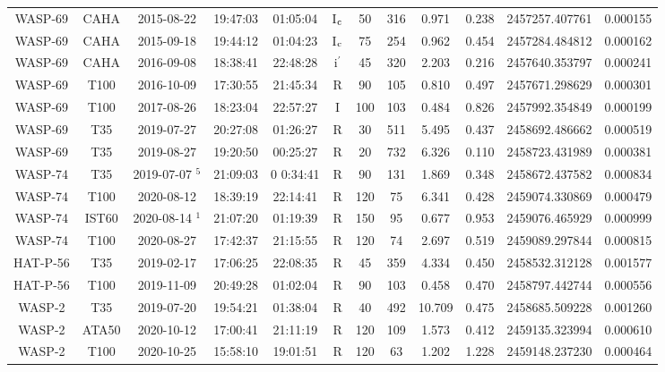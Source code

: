 \documentclass[a4paper,fleqn,usenatbib]{mnras}
\begin{document}
\begin{table*}
\begin{threeparttable}
\begin{tabular}{cccccccccccc}
                WASP-69 & CAHA & 2015-08-22 & 19:47:03 & 01:05:04 & I$_{\rm c}$ & 50 & 316 & 0.971 & 0.238 & 2457257.407761 & 0.000155 \\
                WASP-69 & CAHA & 2015-09-18 & 19:44:12 & 01:04:23 & I$_{\rm c}$ & 75 & 254 & 0.962 & 0.454 & 2457284.484812 & 0.000162 \\
                WASP-69 & CAHA & 2016-09-08 & 18:38:41 & 22:48:28 & i$^{\prime}$ & 45 & 320 & 2.203 & 0.216 & 2457640.353797 & 0.000241 \\
                WASP-69 & T100 & 2016-10-09 & 17:30:55 & 21:45:34 & R & 90 & 105 & 0.810 & 0.497 & 2457671.298629 & 0.000301 \\
                WASP-69 & T100 & 2017-08-26 & 18:23:04 & 22:57:27 & I & 100 & 103 & 0.484 & 0.826 & 2457992.354849 & 0.000199 \\
                WASP-69 & T35 & 2019-07-27 & 20:27:08 & 01:26:27 & R & 30 & 511 & 5.495 & 0.437 & 2458692.486662 & 0.000519 \\
                WASP-69 & T35 & 2019-08-27 & 19:20:50 & 00:25:27 & R & 20 & 732 & 6.326 & 0.110 & 2458723.431989 & 0.000381 \\
                WASP-74 & T35 & 2019-07-07 $^5$ & 21:09:03 &0 0:34:41 & R & 90 & 131 & 1.869 & 0.348 & 2458672.437582 & 0.000834 \\
                WASP-74 & T100 & 2020-08-12 & 18:39:19 & 22:14:41 & R & 120 & 75 & 6.341 & 0.428 & 2459074.330869 & 0.000479 \\
                WASP-74 & IST60 & 2020-08-14 $^1$ & 21:07:20 & 01:19:39 & R & 150 & 95 & 0.677 & 0.953 & 2459076.465929 & 0.000999 \\
                WASP-74 & T100 & 2020-08-27 & 17:42:37 & 21:15:55 & R & 120 & 74 & 2.697 & 0.519 & 2459089.297844 & 0.000815 \\
                HAT-P-56 & T35 & 2019-02-17 & 17:06:25 & 22:08:35 & R & 45 & 359 & 4.334 & 0.450 & 2458532.312128 &  0.001577 \\
                HAT-P-56 & T100 & 2019-11-09 & 20:49:28 & 01:02:04 & R & 90 & 103 & 0.458 & 0.470 & 2458797.442744 & 0.000556 \\
                WASP-2 & T35 & 2019-07-20 & 19:54:21 & 01:38:04 & R & 40 & 492 & 10.709 & 0.475 & 2458685.509228 & 0.001260 \\
                WASP-2 & ATA50 & 2020-10-12 & 17:00:41 & 21:11:19 & R & 120 & 109 & 1.573 & 0.412 & 2459135.323994 & 0.000610 \\
                WASP-2 & T100 & 2020-10-25 & 15:58:10 & 19:01:51 & R & 120 & 63 & 1.202 & 1.228 & 2459148.237230 & 0.000464 \\

\end{tabular}
\end{threeparttable}
\end{table*}
\end{document}
